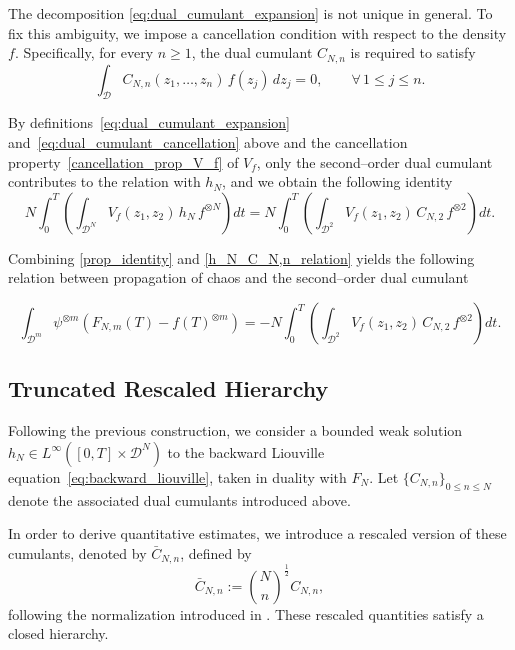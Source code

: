 \documentclass[pdflatex,sn-mathphys-num]{sn-jnl}
\theoremstyle{thmstyleone}%
\theoremstyle{thmstyletwo}%
\theoremstyle{thmstylethree}%
\begin{document}
The decomposition \eqref{eq:dual_cumulant_expansion} is not unique in general. To fix this ambiguity, we impose a cancellation condition with respect to the density $f$. Specifically, for every $n\ge1$, the dual cumulant $C_{N,n}$ is required to satisfy
\begin{equation}\label{eq:dual_cumulant_cancellation}
\int_{\mathcal D} C_{N,n}(z_1,\dots,z_n)\, f(z_j)\,dz_j = 0,
\qquad \forall\, 1\le j\le n.
\end{equation}

By definitions~\eqref{eq:dual_cumulant_expansion} and~\eqref{eq:dual_cumulant_cancellation} above and the cancellation property~\eqref{cancellation_prop_V_f} of \(V_f\), only the second--order dual cumulant contributes to the relation with \(h_N\), and we obtain the following identity
\begin{equation}\label{h_N_C_N,n_relation}
N\int_0^T \!\left( \int_{\mathcal{D}^N} V_f(z_1,z_2)\, h_N\, f^{\otimes N} \right) dt
=
N\int_0^T \!\left( \int_{\mathcal{D}^2} V_f(z_1,z_2)\, C_{N,2}\, f^{\otimes 2} \right) dt.
\end{equation}

Combining \eqref{prop_identity} and \eqref{h_N_C_N,n_relation} yields the following relation between propagation of chaos and the second--order dual cumulant

\begin{equation}\label{prop_cumulants}
     \int_{\mathcal{D}^m} \psi^{\otimes m} \left(F_{N,m}(T) - f(T)^{\otimes m} \right) = -N\int_0^T \!\left( \int_{\mathcal{D}^2} V_f(z_1,z_2)\, C_{N,2}\, f^{\otimes 2} \right) dt.
\end{equation}

\subsection{Truncated Rescaled Hierarchy}

Following the previous construction, we consider a bounded weak solution $h_N \in L^{\infty}([0,T] \times \mathcal{D}^{N})$ to the backward Liouville equation~\eqref{eq:backward_liouville}, taken in duality with $F_{N}$. Let $\{C_{N,n}\}_{0 \le n \le N}$ denote the associated dual cumulants introduced above.

In order to derive quantitative estimates, we introduce a rescaled version of these cumulants, denoted by $\bar{C}_{N,n}$, defined by
\[
\bar{C}_{N,n} := {N \choose n}^{\frac{1}{2}} C_{N,n},
\]
following the normalization introduced in \cite{bresch2024duality}.
These rescaled quantities satisfy a closed hierarchy. 
\medskip
\end{document}
